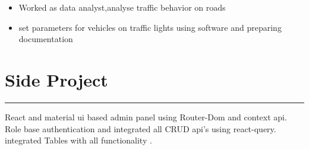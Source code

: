 \documentclass[]{junaid}
\begin{document}
\begin{minipage}[t]{0.66\textwidth}
 
\noindent
\begin{minipage}{0.85\textwidth\vspace{2pt}}
\begin{itemize}
 \item {Worked as data analyst,analyse traffic behavior on roads}
 \item {set parameters for vehicles on traffic lights using software and preparing documentation}
\end{itemize}
\end{minipage}
\section{Side Project}
\noindent\rule{12.5cm}{0.4pt}
 \descript
\noindent
\hspace{5em}%
\begin{minipage}{0.85\textwidth\vspace{5pt}}
React and material ui based admin panel using Router-Dom and context api. Role base authentication and integrated all CRUD  api's using react-query.
integrated Tables with all functionality .
\end{minipage}
\sectionsep


\end{minipage}
\end{document}
